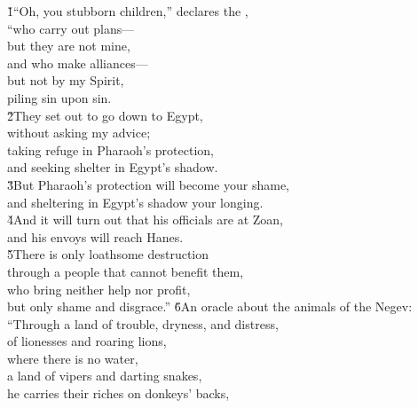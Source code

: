 \begin{poetry}
\poeml {}
\v{1}``Oh, you stubborn children,'' declares the , \\
\poeml ``who carry out plans--- \\
\poemll    but they are not mine, \\
\poeml and who make alliances--- \\
\poemll    but not by my Spirit, \\
\poemlll       piling sin upon sin. \\
\poeml \v{2}They set out to go down to Egypt, \\
\poemll    without asking my advice; \\
\poeml taking refuge in Pharaoh's protection, \\
\poemll    and seeking shelter in Egypt's shadow. \\
\poeml \v{3}But Pharaoh's protection will become your shame, \\
\poemll    and sheltering in Egypt's shadow your longing. \\
\poeml \v{4}And it will turn out that his officials are at Zoan, \\
\poemll    and his envoys will reach Hanes. \\
\poeml \v{5}There is only loathsome destruction \\
\poemll    through a people that cannot benefit them, \\
\poeml who bring neither help nor profit, \\
\poemll    but only shame and disgrace.''
\poeml \v{6}An oracle about the animals of the Negev: \\
\poeml ``Through a land of trouble, dryness, and distress, \\
\poemll    of lionesses and roaring lions, \\
\poemlll       where there is no water, \\
\poeml a land of vipers and darting snakes, \\
\poemll    he carries their riches on donkeys' backs, \\

\end{poetry}
